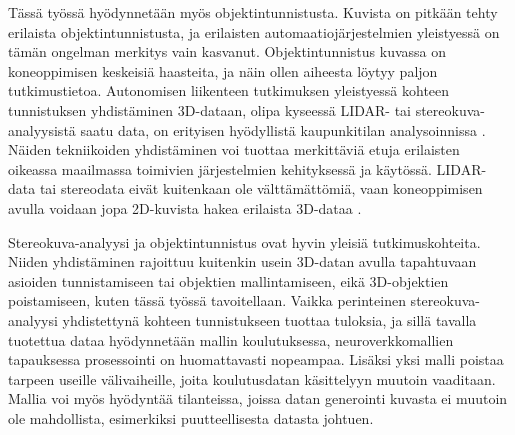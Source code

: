 Tässä työssä hyödynnetään myös objektintunnistusta.  
Kuvista on pitkään tehty erilaista objektintunnistusta, ja erilaisten automaatiojärjestelmien yleistyessä on tämän ongelman merkitys vain kasvanut.
Objektintunnistus kuvassa on koneoppimisen keskeisiä haasteita, ja näin ollen aiheesta löytyy paljon tutkimustietoa.
Autonomisen liikenteen tutkimuksen yleistyessä kohteen tunnistuksen yhdistäminen 3D-dataan,
olipa kyseessä LIDAR- tai stereokuva-analyysistä saatu data, on erityisen hyödyllistä kaupunkitilan analysoinnissa \cite{MengZeYu2024TODf}.
Näiden tekniikoiden yhdistäminen voi tuottaa merkittäviä etuja erilaisten oikeassa maailmassa toimivien järjestelmien kehityksessä ja käytössä.  
LIDAR-data tai stereodata eivät kuitenkaan ole välttämättömiä, vaan koneoppimisen avulla voidaan jopa 2D-kuvista hakea erilaista 3D-dataa \cite{MaXinzhu20243ODF}.  

Stereokuva-analyysi ja objektintunnistus ovat hyvin yleisiä tutkimuskohteita.  
Niiden yhdistäminen rajoittuu kuitenkin usein 3D-datan avulla tapahtuvaan asioiden tunnistamiseen tai objektien mallintamiseen, eikä 3D-objektien poistamiseen, kuten tässä työssä tavoitellaan.  
Vaikka perinteinen stereokuva-analyysi yhdistettynä kohteen tunnistukseen tuottaa tuloksia, ja sillä tavalla tuotettua dataa hyödynnetään mallin koulutuksessa, neuroverkkomallien tapauksessa prosessointi on huomattavasti nopeampaa.  
Lisäksi yksi malli poistaa tarpeen useille välivaiheille, joita koulutusdatan käsittelyyn muutoin vaaditaan.  
Mallia voi myös hyödyntää tilanteissa, joissa datan generointi kuvasta ei muutoin ole mahdollista, esimerkiksi puutteellisesta datasta johtuen. 
